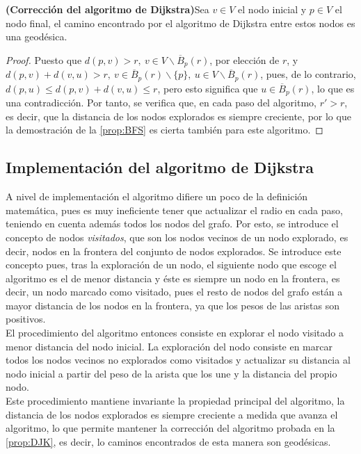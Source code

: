 \begin{proposicion}\label{prop:DJK}
	\textbf{(Corrección del algoritmo de Dijkstra)}Sea $v \in V$ el nodo inicial y $p \in V$ el nodo final, el camino encontrado por el algoritmo de Dijkstra entre estos nodos es una geodésica.
\end{proposicion}

\begin{proof}
	Puesto que $d(p,v) > r,\ v \in V\backslash\overline B_p(r)$, por elección de $r$, y $d(p,v) + d(v,u) > r,\ v \in \overline B_p(r)\backslash\{p\},\ u \in V\backslash\overline B_p(r)$, pues, de lo contrario, $d(p,u) \leq d(p,v) + d(v,u) \leq r$, pero esto significa que $u \in \overline B_p(r)$, lo que es una contradicción. Por tanto, se verifica que, en cada paso del algoritmo, $r' > r$, es decir, que la distancia de los nodos explorados es siempre creciente, por lo que la demostración de la \autoref{prop:BFS} es cierta también para este algoritmo.
\end{proof}

\subsection{Implementación del algoritmo de Dijkstra}

A nivel de implementación el algoritmo difiere un poco de la definición matemática, pues es muy ineficiente tener que actualizar el radio en cada paso, teniendo en cuenta además todos los nodos del grafo. Por esto, se introduce el concepto de nodos \textit{visitados}, que son los nodos vecinos de un nodo explorado, es decir, nodos en la frontera del conjunto de nodos explorados. Se introduce este concepto pues, tras la exploración de un nodo, el siguiente nodo que escoge el algoritmo es el de menor distancia y éste es siempre un nodo en la frontera, es decir, un nodo marcado como visitado, pues el resto de nodos del grafo están a mayor distancia de los nodos en la frontera, ya que los pesos de las aristas son positivos. \\

El procedimiento del algoritmo entonces consiste en explorar el nodo visitado a menor distancia del nodo inicial. La exploración del nodo consiste en marcar todos los nodos vecinos no explorados como visitados y actualizar su distancia al nodo inicial a partir del peso de la arista que los une y la distancia del propio nodo. \\

Este procedimiento mantiene invariante la propiedad principal del algoritmo, la distancia de los nodos explorados es siempre creciente a medida que avanza el algoritmo, lo que permite mantener la corrección del algoritmo probada en la \autoref{prop:DJK}, es decir, lo caminos encontrados de esta manera son geodésicas. \\

